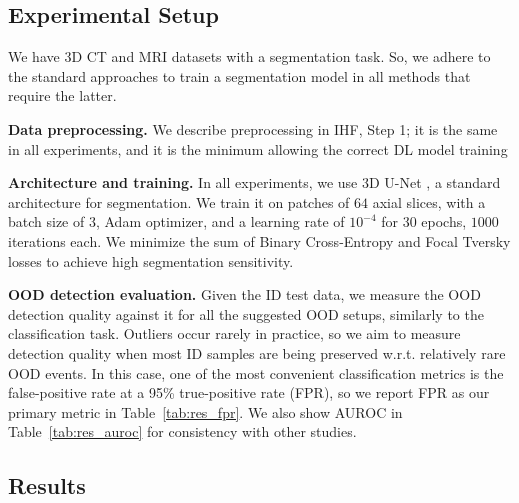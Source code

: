 \subsection{Experimental Setup}

We have 3D CT and MRI datasets with a segmentation task. So, we adhere to the standard approaches to train a segmentation model in all methods that require the latter.

\textbf{Data preprocessing.} We describe preprocessing in IHF, Step 1; it is the same in all experiments, and it is the minimum allowing the correct DL model training

\textbf{Architecture and training.} In all experiments, we use 3D U-Net \cite{isensee2018no}, a standard architecture for segmentation. We train it on patches of $64$ axial slices, with a batch size of $3$, Adam optimizer, and a learning rate of $10^{-4}$ for $30$ epochs, $1000$ iterations each. We minimize the sum of Binary Cross-Entropy and Focal Tversky losses \cite{abraham2019novel} to achieve high segmentation sensitivity. %

\textbf{OOD detection evaluation.} Given the ID test data, we measure the OOD detection quality against it for all the suggested OOD setups, similarly to the classification task. Outliers occur rarely in practice, so we aim to measure detection quality when most ID samples are being preserved w.r.t. relatively rare OOD events. In this case, one of the most convenient classification metrics is the false-positive rate at a 95\% true-positive rate (FPR), so we report FPR as our primary metric in Table~\ref{tab:res_fpr}. We also show AUROC in Table~\ref{tab:res_auroc} for consistency with other studies.



\subsection{Results}


